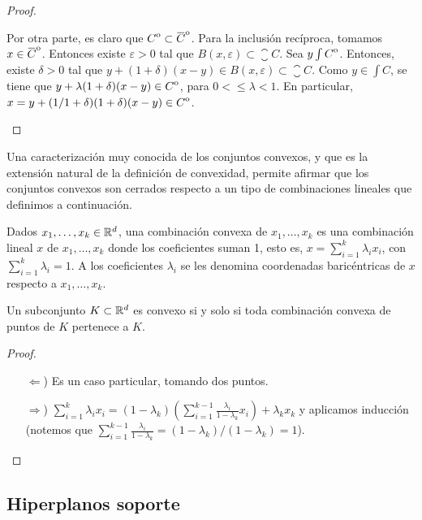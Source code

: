 \documentclass{book}
\begin{document}
\begin{proof}
\begin{enumerate}
		Por otra parte, es claro que $\interior{C} \subset \interior{\closure{C}}$. Para la inclusión recíproca, tomamos $x \in \interior{\closure{C}}$. Entonces existe $\varepsilon > 0$ tal que $B(x,\varepsilon) \subset \closure{C}$. Sea $y \int {\kern0ptC}^{\mathrm{o}}$. Entonces, existe $\delta > 0$ tal que $y + (1+\delta)(x-y) \in B(x,\varepsilon) \subset \closure{C}$. Como $y \in \int{C}$, se tiene que $y + \lambda(1+\delta)(x-y) \in {\kern0ptC}^{\mathrm{o}}$, para $0 <\le \lambda < 1$. En particular, $x = y + (1/1+\delta)(1+\delta)(x-y) \in {\kern0ptC}^{\mathrm{o}}$. 
	\end{enumerate}
\end{proof}

Una caracterización muy conocida de los conjuntos convexos, y que es la extensión natural de la definición de convexidad, permite afirmar que los conjuntos convexos son cerrados respecto a un tipo de combinaciones lineales que definimos a continuación.

\begin{definition}
	Dados $x_1,\dots,x_k \in \mathbb{R}^d$, una combinación convexa de $x_1,\dots,x_k$ es una combinación lineal $x$ de $x_1,\dots,x_k$ donde los coeficientes suman 1, esto es, $x = \sum_{i=1}^k \lambda_ix_i$, con $\sum_{i=1}^k \lambda_i = 1$. A los coeficientes $\lambda_i$ se les denomina coordenadas baricéntricas de $x$ respecto a $x_1,\dots,x_k$.
\end{definition}

\begin{prop}
	Un subconjunto $K \subset \mathbb{R}^d$ es convexo si y solo si toda combinación convexa de puntos de $K$ pertenece a $K$.
\end{prop}
\begin{proof}~
 \begin{enumerate}
	 \item[$\Leftarrow$)] Es un caso particular, tomando dos puntos.

	 \item[$\Rightarrow$)] $\sum_{i=1}^k \lambda_ix_i = (1-\lambda_k)\left( \sum_{i=1}^{k-1}\frac{\lambda_i}{1-\lambda_k}x_i \right) + \lambda_kx_k$ y aplicamos inducción (notemos que $\sum_{i=1}^{k-1}\frac{\lambda_i}{1-\lambda_k} = (1-\lambda_k)/(1-\lambda_k) = 1$).
\end{enumerate}
\end{proof}

\subsection{Hiperplanos soporte}
\end{document}
